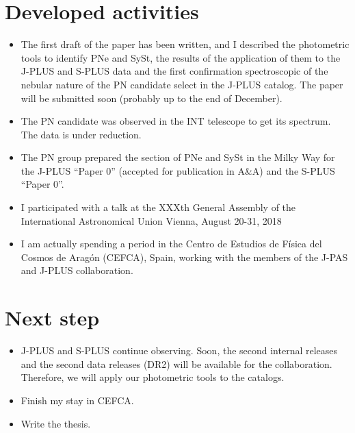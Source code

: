 \documentclass{article}
\begin{document}
\section{Developed activities}
\label{sec:activ}

\begin{itemize}
\item The first  draft of the paper has been written, and I described the photometric tools to identify PNe and SySt, the results of the application of them to the J-PLUS and S-PLUS data and the first confirmation spectroscopic of the nebular nature of the PN candidate select in the J-PLUS catalog. The paper will be submitted soon (probably up to the end of December).  

\item The PN candidate was observed in the INT telescope to get its spectrum. The data is under reduction.

\item The PN group prepared the section of PNe and SySt in the Milky Way for the J-PLUS ``Paper 0'' (accepted for publication in A\&A) and the S-PLUS ``Paper 0''.

\item I participated with a talk at the XXXth General Assembly of the International Astronomical Union Vienna, August 20-31, 2018


\item I am actually spending a period in the Centro de Estudios de Física del Cosmos de Aragón  (CEFCA), Spain, working with the members of the J-PAS and J-PLUS collaboration.
\end{itemize}

\section{Next step}
\label{sec:step}

\begin{itemize}
\item J-PLUS and S-PLUS continue observing. Soon, the second internal releases and the second data releases (DR2) will be available for the collaboration. Therefore, we will apply our photometric tools to the catalogs.

\item Finish my stay in CEFCA. 

\item  Write the thesis. 

\end{itemize}
  



\end{document}
